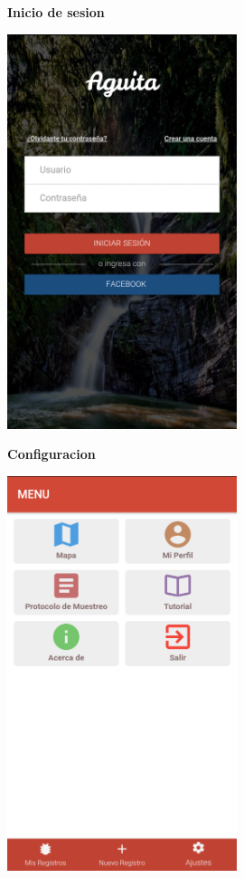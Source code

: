 				\begin{figure}[H]
					\hspace*{1cm}\raggedright\large\textbf{Inicio de sesion}\par\medskip
					\centering
						\includegraphics[width=0.6\textwidth]{Screenshots/login.png}
				\end{figure}

				\begin{figure}
					\hspace*{1cm}\raggedright\large\textbf{Configuracion}\par\medskip
					\centering
						\includegraphics[width=0.6\textwidth]{Screenshots/configuracion.png}
				\end{figure}

